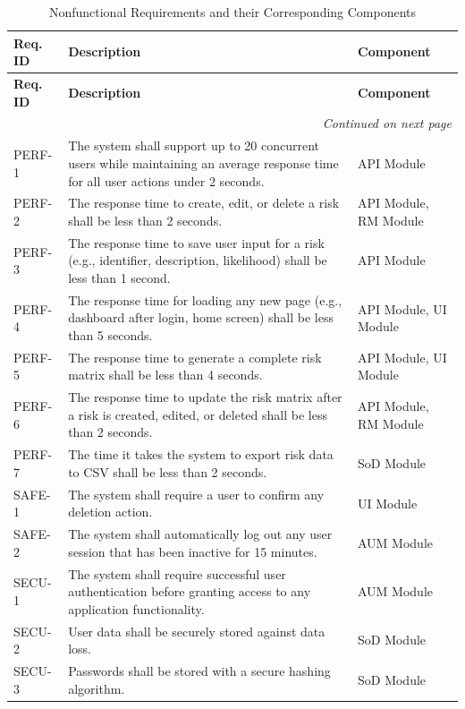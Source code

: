 \documentclass[letterpaper,12pt,oneside,listof=totoc,parskip=full]{scrreprt}
\begin{document}
\begin{longtable}{|l|p{}|l|}
\hline
\textbf{Req. ID} & \textbf{Description} & \textbf{Component} \\
\hline
\endfirsthead
\hline
\textbf{Req. ID} & \textbf{Description} & \textbf{Component} \\
\hline
\endhead
\hline
\multicolumn{3}{|r|}{\small\emph{Continued on next page}} \\
\hline
\endfoot
\hline
\caption{Nonfunctional Requirements and their Corresponding Components}
\label{table:requirements}
\endlastfoot
PERF-1  & The system shall support up to 20 concurrent users while maintaining an average response time for all user actions under 2 seconds. & API Module \\
\hline
PERF-2  & The response time to create, edit, or delete a risk shall be less than 2 seconds. & API Module, RM Module \\
\hline
PERF-3  & The response time to save user input for a risk (e.g., identifier, description, likelihood) shall be less than 1 second. & API Module \\
\hline
PERF-4  & The response time for loading any new page (e.g., dashboard after login, home screen) shall be less than 5 seconds. & API Module, UI Module \\
\hline
PERF-5  & The response time to generate a complete risk matrix shall be less than 4 seconds. & API Module, UI Module \\
\hline
PERF-6  & The response time to update the risk matrix after a risk is created, edited, or deleted shall be less than 2 seconds. & API Module, RM Module \\
\hline
PERF-7  & The time it takes the system to export risk data to CSV shall be less than 2 seconds. & SoD Module \\
\hline
SAFE-1  & The system shall require a user to confirm any deletion action. & UI Module \\
\hline
SAFE-2  & The system shall automatically log out any user session that has been inactive for 15 minutes. & AUM Module \\
\hline
SECU-1  & The system shall require successful user authentication before granting access to any application functionality. & AUM Module \\
\hline
SECU-2  & User data shall be securely stored against data loss. & SoD Module \\
\hline
SECU-3  & Passwords shall be stored with a secure hashing algorithm. & SoD Module \\

\end{longtable}
\end{document}
